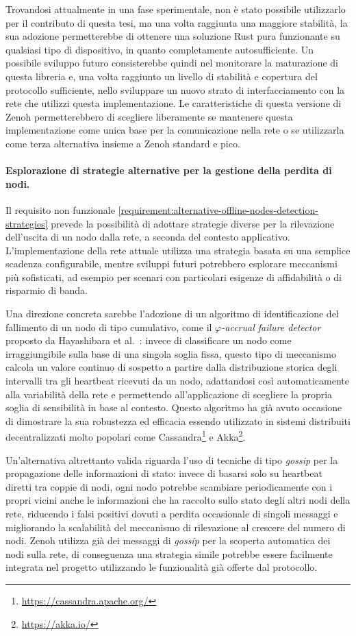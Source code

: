 Trovandosi attualmente in una fase sperimentale, non è stato possibile utilizzarlo
per il contributo di questa tesi, ma una volta raggiunta una maggiore stabilità,
la sua adozione permetterebbe di ottenere una soluzione Rust pura funzionante su
qualsiasi tipo di dispositivo, in quanto completamente autosufficiente.
Un possibile sviluppo futuro consisterebbe quindi nel monitorare la maturazione
di questa libreria e, una volta raggiunto un livello di stabilità e copertura
del protocollo sufficiente, nello sviluppare un nuovo strato di interfacciamento
con la rete che utilizzi questa implementazione.
Le caratteristiche di questa versione di Zenoh permetterebbero di scegliere
liberamente se mantenere questa implementazione come unica base per la comunicazione
nella rete o se utilizzarla come terza alternativa insieme a Zenoh standard e pico.

\paragraph{Esplorazione di strategie alternative per la gestione della perdita
di nodi.}
Il requisito non funzionale \ref{requirement:alternative-offline-nodes-detection-strategies}
prevede la possibilità di adottare strategie diverse per la rilevazione dell'uscita
di un nodo dalla rete, a seconda del contesto applicativo.
L'implementazione della rete attuale utilizza una strategia basata su una semplice
scadenza configurabile, mentre sviluppi futuri potrebbero esplorare meccanismi
più sofisticati, ad esempio per scenari con particolari esigenze di affidabilità
o di risparmio di banda.

Una direzione concreta sarebbe l'adozione di un algoritmo di identificazione del
fallimento di un nodo di tipo cumulativo, come il \emph{$\varphi$-accrual failure
detector} proposto da Hayashibara et al.~\cite{1353004}: invece di classificare
un nodo come irraggiungibile sulla base di una singola soglia fissa, questo
tipo di meccanismo calcola un valore continuo di sospetto a partire dalla
distribuzione storica degli intervalli tra gli heartbeat ricevuti da un nodo,
adattandosi così automaticamente alla variabilità della rete e permettendo
all'applicazione di scegliere la propria soglia di sensibilità in base al contesto.
Questo algoritmo ha già avuto occasione di dimostrare la sua robustezza ed efficacia
essendo utilizzato in sistemi distribuiti decentralizzati molto popolari come
Cassandra\footnote{\url{https://cassandra.apache.org/}} e Akka\footnote{\url{https://akka.io/}}.

Un'alternativa altrettanto valida riguarda l'uso di tecniche di tipo
\emph{gossip} per la propagazione delle informazioni di stato: invece di
basarsi solo su heartbeat diretti tra coppie di nodi, ogni nodo potrebbe
scambiare periodicamente con i propri vicini anche le informazioni che ha
raccolto sullo stato degli altri nodi della rete, riducendo i falsi positivi
dovuti a perdita occasionale di singoli messaggi e migliorando la scalabilità
del meccanismo di rilevazione al crescere del numero di nodi.
Zenoh utilizza già dei messaggi di \emph{gossip} per la scoperta automatica dei
nodi sulla rete, di conseguenza una strategia simile potrebbe essere facilmente
integrata nel progetto utilizzando le funzionalità già offerte dal protocollo.
